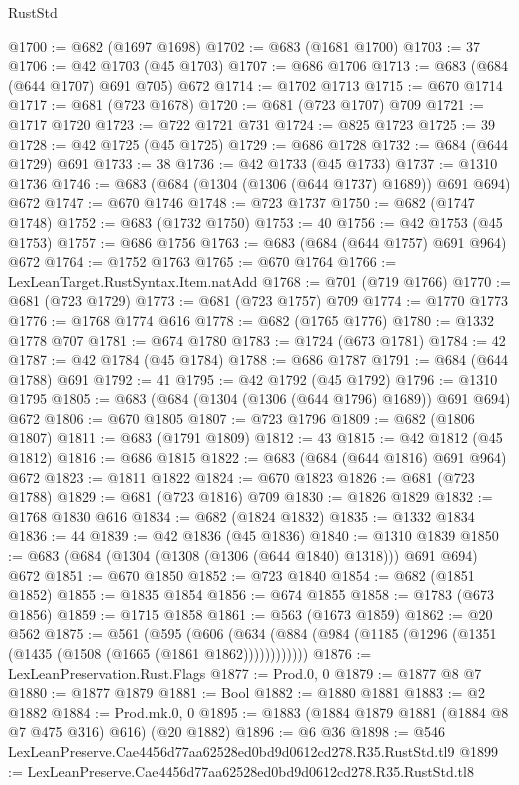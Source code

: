 \begin{lexlean}{RustStd}
\begin{coremodule}
@1700 := @682 (@1697 @1698)
@1702 := @683 (@1681 @1700)
@1703 := 37
@1706 := @42 @1703 (@45 @1703)
@1707 := @686 @1706
@1713 := @683 (@684 (@644 @1707) @691 @705) @672
@1714 := @1702 @1713
@1715 := @670 @1714
@1717 := @681 (@723 @1678)
@1720 := @681 (@723 @1707) @709
@1721 := @1717 @1720
@1723 := @722 @1721 @731
@1724 := @825 @1723
@1725 := 39
@1728 := @42 @1725 (@45 @1725)
@1729 := @686 @1728
@1732 := @684 (@644 @1729) @691
@1733 := 38
@1736 := @42 @1733 (@45 @1733)
@1737 := @1310 @1736
@1746 := @683 (@684 (@1304 (@1306 (@644 @1737) @1689)) @691 @694) @672
@1747 := @670 @1746
@1748 := @723 @1737
@1750 := @682 (@1747 @1748)
@1752 := @683 (@1732 @1750)
@1753 := 40
@1756 := @42 @1753 (@45 @1753)
@1757 := @686 @1756
@1763 := @683 (@684 (@644 @1757) @691 @964) @672
@1764 := @1752 @1763
@1765 := @670 @1764
@1766 := LexLeanTarget.RustSyntax.Item.natAdd
@1768 := @701 (@719 @1766)
@1770 := @681 (@723 @1729)
@1773 := @681 (@723 @1757) @709
@1774 := @1770 @1773
@1776 := @1768 @1774 @616
@1778 := @682 (@1765 @1776)
@1780 := @1332 @1778 @707
@1781 := @674 @1780
@1783 := @1724 (@673 @1781)
@1784 := 42
@1787 := @42 @1784 (@45 @1784)
@1788 := @686 @1787
@1791 := @684 (@644 @1788) @691
@1792 := 41
@1795 := @42 @1792 (@45 @1792)
@1796 := @1310 @1795
@1805 := @683 (@684 (@1304 (@1306 (@644 @1796) @1689)) @691 @694) @672
@1806 := @670 @1805
@1807 := @723 @1796
@1809 := @682 (@1806 @1807)
@1811 := @683 (@1791 @1809)
@1812 := 43
@1815 := @42 @1812 (@45 @1812)
@1816 := @686 @1815
@1822 := @683 (@684 (@644 @1816) @691 @964) @672
@1823 := @1811 @1822
@1824 := @670 @1823
@1826 := @681 (@723 @1788)
@1829 := @681 (@723 @1816) @709
@1830 := @1826 @1829
@1832 := @1768 @1830 @616
@1834 := @682 (@1824 @1832)
@1835 := @1332 @1834
@1836 := 44
@1839 := @42 @1836 (@45 @1836)
@1840 := @1310 @1839
@1850 := @683 (@684 (@1304 (@1308 (@1306 (@644 @1840) @1318))) @691 @694) @672
@1851 := @670 @1850
@1852 := @723 @1840
@1854 := @682 (@1851 @1852)
@1855 := @1835 @1854
@1856 := @674 @1855
@1858 := @1783 (@673 @1856)
@1859 := @1715 @1858
@1861 := @563 (@1673 @1859)
@1862 := @20 @562
@1875 := @561
    (@595 (@606 (@634 (@884 (@984 (@1185 (@1296 (@1351 (@1435 (@1508 (@1665 (@1861 @1862))))))))))))
@1876 := LexLeanPreservation.Rust.Flags
@1877 := Prod.{0, 0}
@1879 := @1877 @8 @7
@1880 := @1877 @1879
@1881 := Bool
@1882 := @1880 @1881
@1883 := @2 @1882
@1884 := Prod.mk.{0, 0}
@1895 := @1883 (@1884 @1879 @1881 (@1884 @8 @7 @475 @316) @616) (@20 @1882)
@1896 := @6 @36
@1898 := @546 LexLeanPreserve.Cae4456d77aa62528ed0bd9d0612cd278.R35.RustStd.tl9
@1899 := LexLeanPreserve.Cae4456d77aa62528ed0bd9d0612cd278.R35.RustStd.tl8

\end{coremodule}
\end{lexlean}
